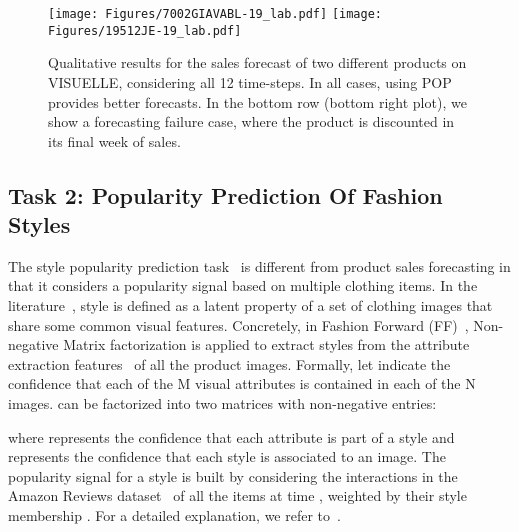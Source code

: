 \documentclass[runningheads]{llncs}
\begin{document}
\begin{figure}
    \centering
\texttt{[image: Figures/7002GIAVABL-19\_lab.pdf]}
    \texttt{[image: Figures/19512JE-19\_lab.pdf]}
    \caption{\footnotesize \label{fig:qlt_visuelle} Qualitative results for the sales forecast of two different products on VISUELLE, considering all 12 time-steps. In all cases, using POP provides better forecasts. In the bottom row (bottom right plot), we show a forecasting failure case, where the product is discounted in its final week of sales.}
    \vspace{-1cm}
\end{figure}



\subsection{Task 2: Popularity Prediction Of Fashion Styles}\label{sec:task2FF}
The style popularity prediction task~\cite{al2017fashion} is different from product sales forecasting in that it considers a popularity signal  based on multiple clothing items. In the literature~\cite{al2017fashion,ma2020kern}, style is defined as a latent property of a set of clothing images that share some common visual features. Concretely, in Fashion Forward (FF)~\cite{al2017fashion}, Non-negative Matrix factorization is applied to extract  styles from the attribute extraction features~\cite{liuLQWTcvpr16DeepFashion} of all the product images. Formally, let  indicate the confidence that each of the M visual attributes is contained in each of the N images.  can be factorized into two matrices with non-negative entries:

where  represents the confidence that each attribute is part of a style and  represents the confidence that each style is associated to an image. The popularity signal  for a style  is built by considering the interactions in the Amazon Reviews dataset~\cite{2015_amazonreviews} of all the items  at time , weighted by their style membership . For a detailed explanation, we refer to~\cite{al2017fashion}.
\end{document}
